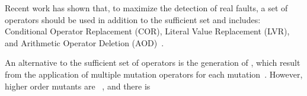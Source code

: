 Recent work has shown that, to maximize the detection of real faults, a set of operators should be used in addition to the sufficient set and includes: Conditional Operator Replacement (COR),
Literal Value Replacement (LVR), and Arithmetic Operator Deletion (AOD)~\cite{Kintis2018}.

An alternative to the sufficient set of operators is the generation of , which result from the application of multiple mutation operators for each mutation~\cite{jia2009higher,kintis2010evaluating,offutt1992investigations,papadakis2010empirical}. However, higher order mutants are ~\cite{papadakis2010mutation,papadakis2019mutation}, and there is

%
%
%


%
%

